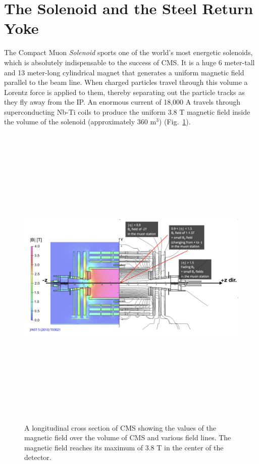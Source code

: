 \section{The Solenoid and the Steel Return Yoke}
\label{sec:solenoid}

The Compact Muon \emph{Solenoid} sports one of the world's most energetic solenoids, which is absolutely indispensable to the success of CMS.
It is a huge 6 meter-tall and 13 meter-long cylindrical magnet that generates a uniform magnetic field parallel to the beam line.
When charged particles travel through this volume a Lorentz force is applied to them,
thereby separating out the particle tracks as they fly away from the IP.
An enormous current of 18,000 A travels through superconducting Nb-Ti coils to produce the uniform 3.8 T magnetic field inside the volume of the solenoid (approximately 360 m$^3$)
(Fig.~\ref{fig:cms_magnetic_field}).
\begin{figure}[pbth]
\centering
\includegraphics[width=15cm,height=15cm,keepaspectratio]{figures/cms/solenoid/CMS_longitudinal_view_magnetic_field.png}
    \caption{
    A longitudinal cross section of CMS showing the values of the magnetic field over the volume of CMS and various field lines. 
    The magnetic field reaches its maximum of 3.8 T in the center of the detector.}
    \label{fig:cms_magnetic_field}
\end{figure}
